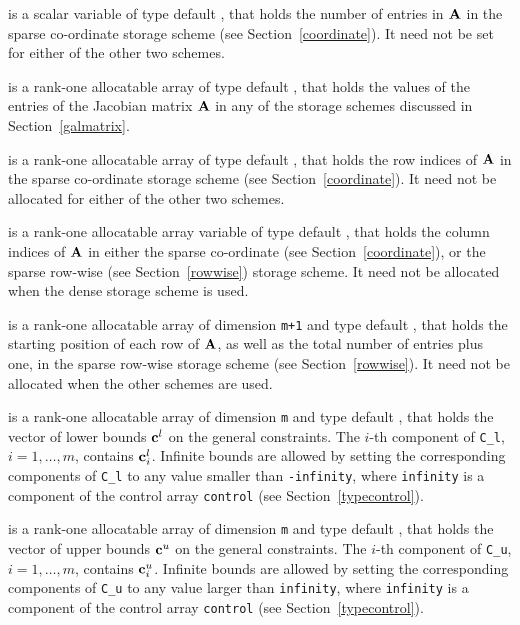 \documentclass{galahad}
\begin{document}
\begin{description}
\begin{description}
 is a scalar variable of type default \integer, that 
holds the number of entries in ${\mathbf{A}}$
in the sparse co-ordinate storage scheme (see Section~\ref{coordinate}). 
It need not be set for either of the other two schemes.

 is a rank-one allocatable array of type default \realdp, that holds
the values of the entries of the Jacobian matrix ${\mathbf{A}}$ in any of the 
storage schemes discussed in Section~\ref{galmatrix}.

 is a rank-one allocatable array of type default \integer,
that holds the row indices of ${\mathbf{A}}$ in the sparse co-ordinate storage
scheme (see Section~\ref{coordinate}). 
It need not be allocated for either of the other two schemes.

 is a rank-one allocatable array variable of type default \integer,
that holds the column indices of ${\mathbf{A}}$ in either the sparse co-ordinate 
(see Section~\ref{coordinate}), or the sparse row-wise 
(see Section~\ref{rowwise}) storage scheme.
It need not be allocated when the dense storage scheme is used.

 is a rank-one allocatable array of dimension {\tt m+1} and type 
default \integer, that holds the 
starting position of each row of ${\mathbf{A}}$, as well
as the total number of entries plus one, in the sparse row-wise storage
scheme (see Section~\ref{rowwise}). It need not be allocated when the
other schemes are used.

\end{description}

 is a rank-one allocatable array of dimension {\tt m} and type 
default \realdp, that holds the vector of lower bounds ${\mathbf{c}}^{l}$ 
on the general constraints. The $i$-th component of 
{\tt C\_l}, $i = 1, \ldots , m$, contains ${\mathbf{c}}_{i}^{l}$.
Infinite bounds are allowed by setting the corresponding 
components of {\tt C\_l} to any value smaller than {\tt -infinity}, 
where {\tt infinity} is a component of the control array {\tt control} 
(see Section~\ref{typecontrol}).

 is a rank-one allocatable array of dimension {\tt m} and type 
default \realdp, that holds the vector of upper bounds ${\mathbf{c}}^{u}$ 
on the general constraints. The $i$-th component of 
{\tt C\_u}, $i = 1,  \ldots ,  m$, contains ${\mathbf{c}}_{i}^{u}$.
Infinite bounds are allowed by setting the corresponding 
components of {\tt C\_u} to any value larger than {\tt infinity}, 
where {\tt infinity} is a component of the control array {\tt control} 
(see Section~\ref{typecontrol}).


\end{description}
\end{document}
